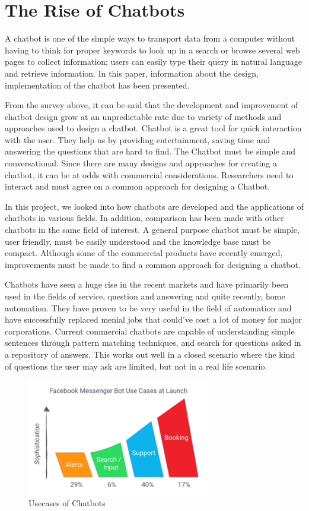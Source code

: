 \pagebreak

\section{The Rise of Chatbots}

A chatbot is one of the simple ways to transport data from a computer without having to think for proper keywords to look up in a search or browse several web pages to collect information; users can easily type their query in natural language and retrieve information. In this paper, information about the design, implementation of the chatbot has been presented.

From the survey above, it can be said that the development and improvement of chatbot design grow at an unpredictable rate due to variety of methods and approaches used to design a chatbot. Chatbot is a great tool for quick interaction with the user. They help us by providing entertainment, saving time and answering the questions that are hard to find. The Chatbot must be simple and conversational. Since there are many designs and approaches for creating a chatbot, it can be at odds with commercial considerations. Researchers need to interact and must agree on a common approach for designing a Chatbot.

In this project, we looked into how chatbots are developed and the applications of chatbots in various fields. In addition, comparison has been made with other chatbots in the same field of interest. A general purpose chatbot must be simple, user friendly, must be easily understood and the knowledge base must be compact. Although some of the commercial products have recently emerged, improvements must be made to find a common approach for designing a chatbot.

Chatbots have seen a huge rise in the recent markets and have primarily been used in the fields of service, question and answering and quite recently, home automation. They have proven to be very useful in the field of automation and have successfully replaced menial jobs that could’ve cost a lot of money for major corporations. Current commercial chatbots are capable of understanding simple sentences through pattern matching techniques, and search for questions asked in a repository of answers. This works out well in a closed scenario where the kind of questions the user may ask are limited, but not in a real life scenario.

\begin{figure}[H]
    \centering
    \includegraphics[width=8cm]{images/chatbot-usecases.png}
    \caption{Usecases of Chatbots}
    \label{fig:chatbot-usecases}
\end{figure}


